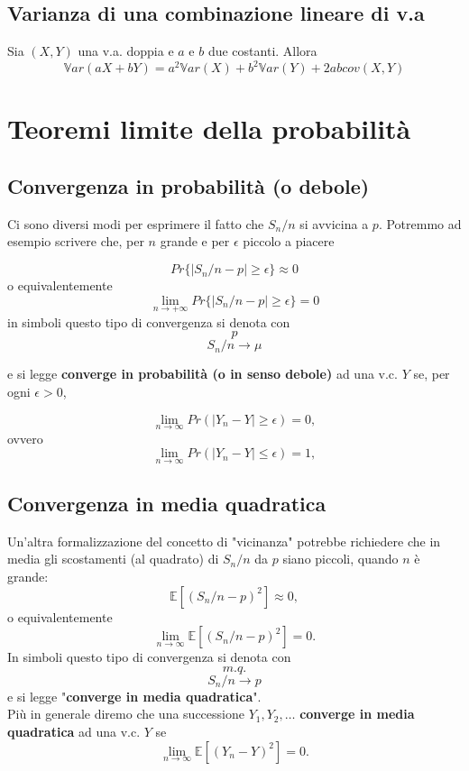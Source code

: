 \documentclass[a4paper]{report}
\begin{document}
  \section{Varianza di una combinazione lineare di v.a}
  Sia $(X,Y)$ una v.a. doppia e $a$ e $b$ due costanti. Allora
  \[ \mathbb{V}ar(aX + bY)= a^2\mathbb{V}ar(X) + b^2\mathbb{V}ar(Y) + 2abcov(X,Y) \]


  \chapter{Teoremi limite della probabilità}
  \section{Convergenza in probabilità (o debole)}
  Ci sono diversi modi per esprimere il fatto che $S_n/n$ si avvicina a $p$. Potremmo ad esempio scrivere che, per $n$ grande e per $\epsilon$ piccolo a piacere

  \[ Pr\{ |S_n/n -p| \geq \epsilon \} \approx 0 \]
  o equivalentemente
  \[ \lim_{n \rightarrow +\infty} Pr\{ |S_n/n -p| \geq \epsilon \} = 0 \]
  in simboli questo tipo di convergenza si denota con
  \[ p \]
  \[ S_n/n \longrightarrow \mu \]

  e si legge \textbf{converge in probabilità (o in senso debole)} ad una v.c. $Y$ se, per ogni $\epsilon > 0$,

  \[ \lim_{n \to \infty} Pr(|Y_n - Y| \geq \epsilon) = 0, \]
  ovvero
  \[ \lim_{n \to \infty} Pr(|Y_n - Y| \leqslant \epsilon) = 1, \]

  \section{Convergenza in media quadratica}
  Un'altra formalizzazione del concetto di "vicinanza" potrebbe richiedere che in media gli scostamenti (al quadrato) di $S_n/n$ da $p$ siano piccoli, quando $n$ è grande:
  \[\mathbb{E}[(S_n/n - p)^2] \approx 0, \]
  o equivalentemente
  \[ \lim_{n \to \infty} \mathbb{E}[(S_n/n - p)^2] = 0. \]
  In simboli questo tipo di convergenza si denota con
  \[ m.q. \]
  \[ S_n/n \longrightarrow p \]
  e si legge "\textbf{converge in media quadratica}".\\
  Più in generale diremo che una successione $Y_1,Y_2,\dots$ \textbf{converge in media quadratica} ad una v.c. $Y$ se
  \[ \lim_{n \to \infty} \mathbb{E}[(Y_n - Y)^2] = 0. \]
\end{document}
